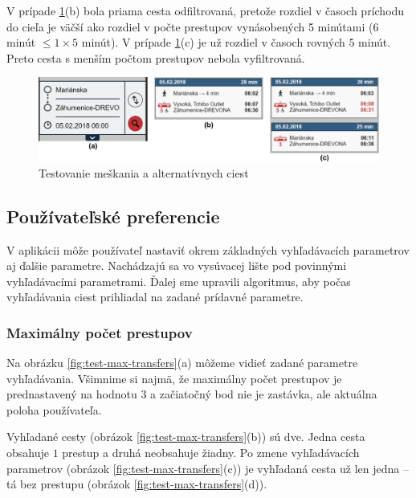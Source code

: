 V prípade \ref{fig:test-delay-alternative}(b) bola priama cesta odfiltrovaná, pretože rozdiel v časoch príchodu do cieľa je väčší ako rozdiel v počte prestupov vynásobených 5 minútami ($6$ minút $\leq 1\times5$ minút).
V prípade \ref{fig:test-delay-alternative}(c) je už rozdiel v časoch rovných $5$ minút. Preto cesta s menším počtom prestupov nebola vyfiltrovaná.

\begin{figure}[H]
\centerline{\includegraphics[width=1.0\textwidth]{images/test/delay-alternative}}
\caption[Testovanie meškania a alternatívnych ciest]{Testovanie meškania a alternatívnych ciest}
\label{fig:test-delay-alternative}
\end{figure}

\subsection{Používateľské preferencie}

V aplikácii môže používateľ nastaviť okrem základných vyhľadávacích parametrov aj ďalšie parametre. Nachádzajú sa vo vysúvacej lište pod povinnými vyhľadávacími parametrami. Ďalej sme upravili algoritmus, aby počas vyhľadávania ciest prihliadal na zadané prídavné parametre.

\subsubsection{Maximálny počet prestupov}
Na obrázku \ref{fig:test-max-transfers}(a) môžeme vidieť zadané parametre vyhľadávania. Všimnime si najmä, že maximálny počet prestupov je prednastavený na hodnotu $3$ a začiatočný bod nie je zastávka, ale aktuálna poloha používateľa. 

Vyhľadané cesty (obrázok \ref{fig:test-max-transfers}(b)) sú dve. Jedna cesta obsahuje $1$ prestup a druhá neobsahuje žiadny. Po zmene vyhľadávacích parametrov (obrázok \ref{fig:test-max-transfers}(c)) je vyhľadaná cesta už len jedna – tá bez prestupu (obrázok \ref{fig:test-max-transfers}(d)).

